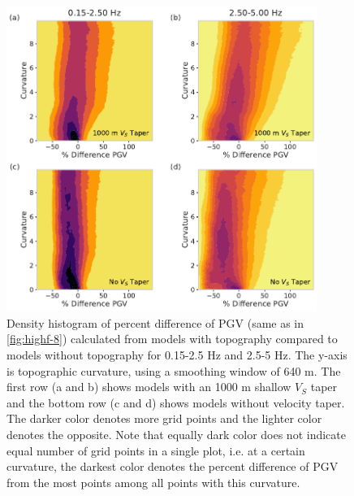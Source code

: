 \begin{figure}[!ht]
  \centering
  \includegraphics[width=0.9\textwidth,height=0.9\textheight,keepaspectratio]{figures/figure_highf_14.pdf}
  \caption{
    Density histogram of percent difference of PGV (same as in \cref{fig:highf-8}) calculated from models with topography compared to models without topography for 0.15-2.5 Hz and 2.5-5 Hz. The y-axis is topographic curvature, using a smoothing window of 640 m. The first row (a and b) shows models with an 1000 m shallow $V_S$ taper and the bottom row (c and d) shows models without velocity taper. The darker color denotes more grid points and the lighter color denotes the opposite. Note that equally dark color does not indicate equal number of grid points in a single plot, i.e. at a certain curvature, the darkest color denotes the percent difference of PGV from the most points among all points with this curvature.
  }
  \label{fig:highf-14}
\end{figure}
\clearpage


